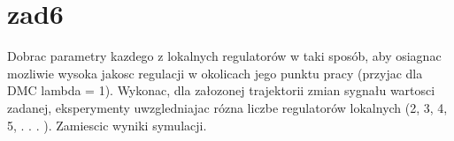 \section{zad6}
\label{projekt:zad6}

Dobrac parametry kazdego z lokalnych regulatorów w taki sposób, aby osiagnac mozliwie
wysoka jakosc regulacji w okolicach jego punktu pracy (przyjac dla DMC lambda = 1).
Wykonac, dla załozonej trajektorii zmian sygnału wartosci zadanej, eksperymenty
uwzgledniajac rózna liczbe regulatorów lokalnych (2, 3, 4, 5, . . . ). Zamiescic wyniki
symulacji.

%    



\newpage
